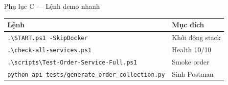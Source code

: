 \documentclass[aspectratio=169,12pt]{beamer}
\begin{document}
\begin{frame}{Phụ lục C — Lệnh demo nhanh}
  \small
  \begin{tabular}{@{}ll@{}}
    \toprule
    \textbf{Lệnh} & \textbf{Mục đích} \\
    \midrule
    \texttt{.\textbackslash START.ps1 -SkipDocker} & Khởi động stack \\
    \texttt{.\textbackslash check-all-services.ps1} & Health 10/10 \\
    \texttt{.\textbackslash scripts\textbackslash Test-Order-Service-Full.ps1} & Smoke order \\
    \texttt{python api-tests/generate\_order\_collection.py} & Sinh Postman \\
    \bottomrule
  \end{tabular}
\end{frame}
\end{document}
